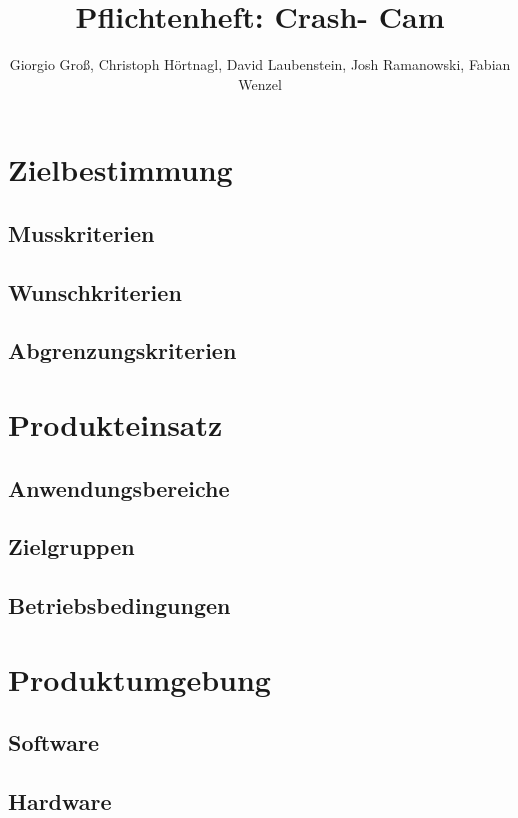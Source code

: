\documentclass[11pt,a4paper]{article}
\author{Giorgio Groß, Christoph Hörtnagl, David Laubenstein,  Josh Ramanowski,  Fabian Wenzel}
\title{Pflichtenheft: Crash- Cam}
\begin{document}
\maketitle
\newpage
\tableofcontents
\newpage
\section{Zielbestimmung}


\subsection{Musskriterien}

\subsection{Wunschkriterien}

\subsection{Abgrenzungskriterien}

\section{Produkteinsatz}

\subsection{Anwendungsbereiche}

\subsection{Zielgruppen}

\subsection{Betriebsbedingungen}


\section{Produktumgebung}

\subsection{Software}

\subsection{Hardware}
\end{document}
